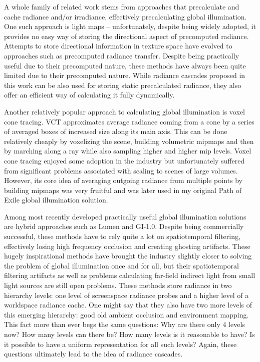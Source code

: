 \documentclass{jcgt}
\begin{document}
A whole family of related work stems from approaches that precalculate and cache radiance and/or irradiance, effectively precalculating global illumination.
One such approach is light maps -- unfortunately, despite being widely adopted, it provides no easy way of storing the directional aspect of precomputed radiance. Attempts to store directional information in texture space have evolved to approaches such as precomputed radiance transfer. Despite being practically useful due to their precomputed nature, these methods have always been quite limited due to their precomputed nature. While radiance cascades proposed in this work can be also used for storing static precalculated radiance, they also offer an efficient way of calculating it fully dynamically.

Another relatively popular approach to calculating global illumination is voxel cone tracing. VCT approximates average radiance coming from a cone by a series of averaged boxes of increased size along its main axis. This can be done relatively cheaply by voxelizing the scene, building volumetric mipmaps and then by marching along a ray while also sampling higher and higher mip levels. Voxel cone tracing enjoyed some adoption in the industry but unfortunately suffered from significant problems associated with scaling to scenes of large volumes.
However, its core idea of averaging outgoing radiance from multiple points by building mipmaps was very fruitful and was later used in my original Path of Exile global illumination solution.


Among most recently developed practically useful global illumination solutions are hybrid approaches such as Lumen and GI-1.0. Despite being commercially successful, these methods have to rely quite a lot on spatiotemporal filtering, effectively
losing high frequency occlusion and creating ghosting artifacts. These hugely inspirational methods have brought the industry slightly closer to solving the problem of global illumination once and for all, but their spatiotemporal filtering artifacts as well as problems calculating far-field indirect light from small light sources are still open problems. These methods store radiance in two hierarchy levels: one level of screenspace radiance probes and a higher level of a worldspace radiance cache. One might say that they also have two more levels of
this emerging hierarchy: good old ambient occlusion and environment mapping. This fact more than ever begs the same questions: Why are there only 4 levels now? How many levels can there be? How many levels is
it reasonable to have? Is it possible to have a uniform representation for all such levels? Again, these questions ultimately lead to the idea of radiance cascades.
\end{document}
